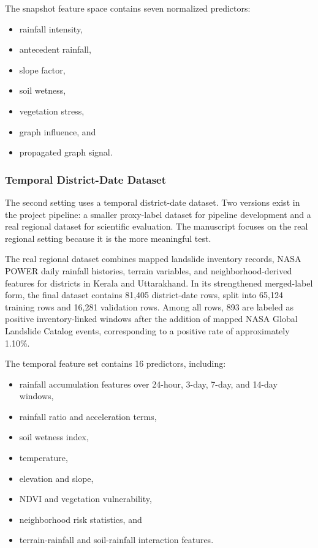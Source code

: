\documentclass[pdflatex,sn-mathphys-num]{sn-jnl}
\begin{document}
The snapshot feature space contains seven normalized predictors:
\begin{itemize}
\item rainfall intensity,
\item antecedent rainfall,
\item slope factor,
\item soil wetness,
\item vegetation stress,
\item graph influence, and
\item propagated graph signal.
\end{itemize}

\subsubsection{Temporal District-Date Dataset}

The second setting uses a temporal district-date dataset. Two versions exist in the project pipeline: a smaller proxy-label dataset for pipeline development and a real regional dataset for scientific evaluation. The manuscript focuses on the real regional setting because it is the more meaningful test.

The real regional dataset combines mapped landslide inventory records, NASA POWER daily rainfall histories, terrain variables, and neighborhood-derived features for districts in Kerala and Uttarakhand. In its strengthened merged-label form, the final dataset contains 81,405 district-date rows, split into 65,124 training rows and 16,281 validation rows. Among all rows, 893 are labeled as positive inventory-linked windows after the addition of mapped NASA Global Landslide Catalog events, corresponding to a positive rate of approximately 1.10\%.

The temporal feature set contains 16 predictors, including:
\begin{itemize}
\item rainfall accumulation features over 24-hour, 3-day, 7-day, and 14-day windows,
\item rainfall ratio and acceleration terms,
\item soil wetness index,
\item temperature,
\item elevation and slope,
\item NDVI and vegetation vulnerability,
\item neighborhood risk statistics, and
\item terrain-rainfall and soil-rainfall interaction features.
\end{itemize}
\end{document}
